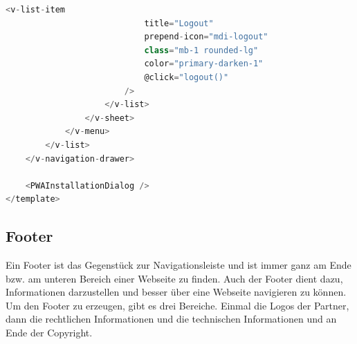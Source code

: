 \begin{lstlisting}[language={JavaScript}, caption={Navigationsleiste für Web als auch Mobile}]
                        <v-list-item
                            title="Logout"
                            prepend-icon="mdi-logout"
                            class="mb-1 rounded-lg"
                            color="primary-darken-1"
                            @click="logout()"
                        />
                    </v-list>
                </v-sheet>
            </v-menu>
        </v-list>
    </v-navigation-drawer>

    <PWAInstallationDialog />
</template>
\end{lstlisting}

\subsection{Footer}
Ein Footer ist das Gegenstück zur Navigationsleiste und ist immer ganz am Ende bzw. am unteren Bereich einer Webseite zu finden.
Auch der Footer dient dazu, Informationen darzustellen und besser über eine Webseite navigieren zu können.
Um den Footer zu erzeugen, gibt es drei Bereiche.
Einmal die Logos der Partner, dann die rechtlichen Informationen und die technischen Informationen und an Ende der Copyright.

